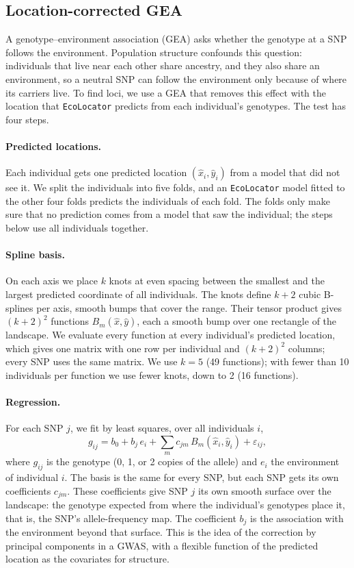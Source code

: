 \documentclass[]{article}
\newcommand{\ecolocator}{\texttt{EcoLocator}\xspace}
\begin{document}
\subsection{Location-corrected GEA}
\label{sec:correctedgea}

A genotype--environment association (GEA) asks
whether the genotype at a SNP follows the environment.
Population structure confounds this question:
individuals that live near each other share ancestry,
and they also share an environment,
so a neutral SNP can follow the environment
only because of where its carriers live.
To find loci, we use a GEA that removes this effect
with the location that \ecolocator predicts
from each individual's genotypes.
The test has four steps.

\paragraph{Predicted locations.}
Each individual gets one predicted location $(\hat{x}_i, \hat{y}_i)$
from a model that did not see it.
We split the individuals into five folds,
and an \ecolocator model fitted to the other four folds
predicts the individuals of each fold.
The folds only make sure that no prediction
comes from a model that saw the individual;
the steps below use all individuals together.

\paragraph{Spline basis.}
On each axis we place $k$ knots at even spacing
between the smallest and the largest predicted coordinate
of all individuals.
The knots define $k + 2$ cubic B-splines per axis,
smooth bumps that cover the range.
Their tensor product gives $(k + 2)^2$ functions $B_m(\hat{x}, \hat{y})$,
each a smooth bump over one rectangle of the landscape.
We evaluate every function at every individual's predicted location,
which gives one matrix with one row per individual
and $(k + 2)^2$ columns;
every SNP uses the same matrix.
We use $k = 5$ (49 functions);
with fewer than 10 individuals per function
we use fewer knots, down to 2 (16 functions).

\paragraph{Regression.}
For each SNP $j$, we fit by least squares, over all individuals $i$,
\begin{equation}
g_{ij} = b_0 + b_j\, e_i
+ \sum_{m} c_{jm}\, B_m(\hat{x}_i, \hat{y}_i) + \varepsilon_{ij},
\label{eq:correctedgea}
\end{equation}
where $g_{ij}$ is the genotype (0, 1, or 2 copies of the allele)
and $e_i$ the environment of individual $i$.
The basis is the same for every SNP,
but each SNP gets its own coefficients $c_{jm}$.
These coefficients give SNP $j$ its own smooth surface over the landscape:
the genotype expected from where the individual's genotypes place it,
that is, the SNP's allele-frequency map.
The coefficient $b_j$ is the association with the environment
beyond that surface.
This is the idea of the correction by principal components in a GWAS,
with a flexible function of the predicted location
as the covariates for structure.
\end{document}
